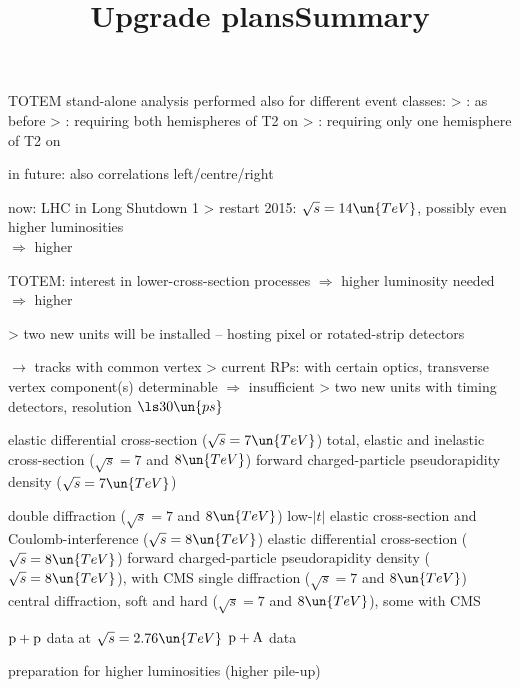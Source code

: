 \> TOTEM stand-alone analysis performed also for different event classes:
\>> : as before
\>> : requiring both hemispheres of T2 on
\>> : requiring only one hemisphere of T2 on

\vskip2mm

\vfil
\> in future: also correlations left/centre/right

\newpage %
\title{Upgrade plans}

\> now: LHC in Long Shutdown 1
\>> restart 2015: $\sqrt s = 14\un{TeV}$, possibly even higher luminosities\\
$\Rightarrow$ higher 

\> TOTEM: interest in lower-cross-section processes $\Rightarrow$ higher luminosity needed\\
$\Rightarrow$ higher 

\vfil
{}

\> 

\>> two new units will be installed -- hosting \cGr pixel\cFg{} or \cGr rotated-strip\cFg{} detectors


\>  $\rightarrow$ tracks with common vertex
\>> current RPs: with certain optics, transverse vertex component(s) determinable $\Rightarrow$ insufficient
\>> two new units with \cGr timing detectors\cFg{}, resolution $\ls 30\un{ps}$


\newpage %
\title{Summary}

{

\noindent{}

\> elastic differential cross-section ($\sqrt s = 7\un{TeV}$)
\> total, elastic and inelastic cross-section ($\sqrt s = 7$ and $8\un{TeV}$)
\> forward charged-particle pseudorapidity density ($\sqrt s = 7\un{TeV}$)

\vfil
\noindent{}

\> double diffraction ($\sqrt s = 7$ and $8\un{TeV}$)
\> low-$|t|$ elastic cross-section and Coulomb-interference ($\sqrt s = 8\un{TeV}$)
\> elastic differential cross-section ($\sqrt s = 8\un{TeV}$)
\> forward charged-particle pseudorapidity density ($\sqrt s = 8\un{TeV}$), with CMS
\> single diffraction ($\sqrt s = 7$ and $8\un{TeV}$)
\> central diffraction, soft and hard ($\sqrt s = 7$ and $8\un{TeV}$), some with CMS


\vfil
\noindent{}

\> $\rm p + p$ data at $\sqrt s = 2.76\un{TeV}$
\> $\rm p + A$ data



\vfil
\noindent{}
\> preparation for higher luminosities (higher pile-up)
}

\vfil
\eject
\bye
